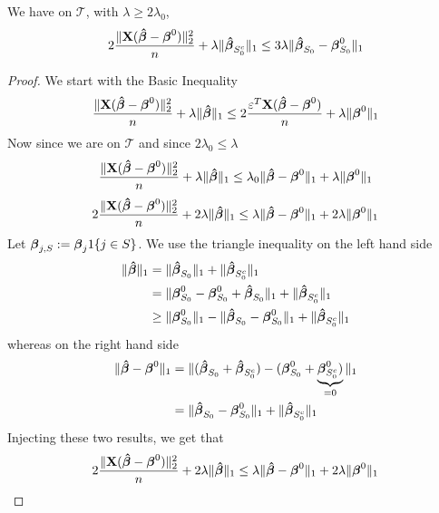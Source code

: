 \begin{lemma}[Lemma 6.3.]
    We have on $\mathscr{T}$, with $\lambda \geq 2 \lambda_{0}$,
    \begin{equation}
        \label{eqn: lemma 6.3.}
        2\frac{ \|\mathbf{X} (\boldsymbol{\hat{\beta}}-\boldsymbol{\beta}^{0} ) \|_{2}^{2}}{n} + \lambda \|\boldsymbol{\hat{\beta}}_{S_{0}^{c}} \|_{1} \leq 3 \lambda \|\boldsymbol{\hat{\beta}}_{S_{0}}-\boldsymbol{\beta}_{S_{0}}^{0} \|_{1}
    \end{equation}
\end{lemma}
\begin{proof}
    We start with the Basic Inequality
    $$
        \frac{\| \mathbf{X} (\boldsymbol{\hat{\beta}}-\boldsymbol{\beta}^{0})\|_{2}^{2}}{n} + \lambda\|\boldsymbol{\hat{\beta}}\|_{1} \leq 2 \frac{\varepsilon^{T} \mathbf{X} (\boldsymbol{\hat{\beta}}-\boldsymbol{\beta}^{0})}{n}+\lambda\|\boldsymbol{\beta}^{0}\|_{1}
    $$
    Now since we are on $\mathscr{T}$ and since $2 \lambda_0 \leq \lambda$
    $$
        \frac{\| \mathbf{X} (\boldsymbol{\hat{\beta}}-\boldsymbol{\beta}^{0})\|_{2}^{2}}{n} + \lambda\|\boldsymbol{\hat{\beta}}\|_{1} \leq \lambda_0 \|\boldsymbol{\hat{\beta}}-\boldsymbol{\beta}^{0}\|_1 + \lambda\|\boldsymbol{\beta}^{0}\|_{1}
    $$
    $$
        2 \frac{\| \mathbf{X} (\boldsymbol{\hat{\beta}}-\boldsymbol{\beta}^{0})\|_{2}^{2}}{n}+2 \lambda\|\boldsymbol{\hat{\beta}}\|_{1} \leq \lambda \|\boldsymbol{\hat{\beta}}-\boldsymbol{\beta}^{0} \|_{1}+2 \lambda \|\boldsymbol{\beta}^{0} \|_{1}
    $$
    Let $\boldsymbol{\beta}_{j, S}:=\boldsymbol{\beta}_{j} 1\{j \in S\}$. We use the triangle inequality on the left hand side
    \begin{align*}
        \|\boldsymbol{\hat{\beta}}\|_{1}
         & = \|\boldsymbol{\hat{\beta}}_{S_{0}} \|_{1} + \|\boldsymbol{\hat{\beta}}_{S_{0}^{c}} \|_{1}                                                \\
         & = \|\boldsymbol{\beta}_{S_{0}}^{0} - \boldsymbol{\beta}_{S_{0}}^{0} + \boldsymbol{\hat{\beta}}_{S_{0}} \|_{1} + \|\boldsymbol{\hat{\beta}}_{S_{0}^{c}} \|_{1}          \\
         & \geq \|\boldsymbol{\beta}_{S_{0}}^{0} \|_{1} - \|\boldsymbol{\hat{\beta}}_{S_{0}}-\boldsymbol{\beta}_{S_{0}}^{0} \|_{1}+ \|\boldsymbol{\hat{\beta}}_{S_{0}^{c}} \|_{1}
    \end{align*}
    whereas on the right hand side
    \begin{align*}
        \|\boldsymbol{\hat{\beta}}-\boldsymbol{\beta}^{0} \|_{1}
         & =  \| (\boldsymbol{\hat{\beta}}_{S_{0}} + \boldsymbol{\hat{\beta}}_{S_{0}^{c}}) - (\boldsymbol{\beta}_{S_{0}}^{0} + \underbrace{\boldsymbol{\beta}_{S_{0}^{c}}^0)}_{=0} \|_{1} \\
         & =  \| \boldsymbol{\hat{\beta}}_{S_{0}}-\boldsymbol{\beta}_{S_{0}}^{0} \|_{1} + \|\boldsymbol{\hat{\beta}}_{S_{0}^{c}} \|_{1}
    \end{align*}
    Injecting these two results, we get that
    \begin{align*}
                 & 2 \frac{\| \X (\btahat-\bta^{0})\|_{2}^{2}}{n} + 2 \lambda\|\btahat\|_{1} \leq \lambda \|\btahat-\bta^{0} \|_{1}+2 \lambda \|\bta^{0} \|_{1}                                                                                                \\

\end{align*}
\end{proof}
